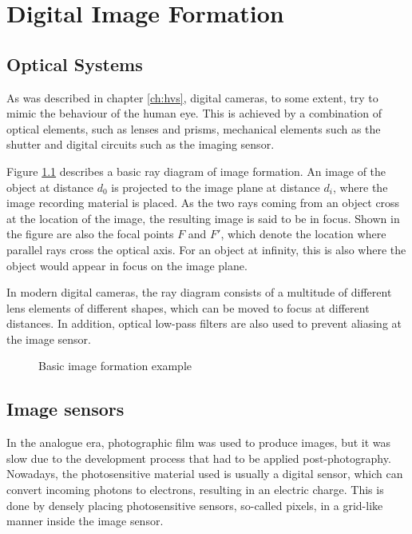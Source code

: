 \chapter{Digital Image Formation}
\label{ch:dif}

\section{Optical Systems}
As was described in chapter \ref{ch:hvs}, digital cameras, to some extent, try to mimic the behaviour of the human eye. This is achieved by a combination of optical elements, such as lenses and prisms, mechanical elements such as the shutter and digital circuits such as the imaging sensor. 

Figure \ref{fig:optics} describes a basic ray diagram of image formation. An image of the object at distance $d_0$ is projected to the image plane at distance $d_i$, where the image recording material is placed. As the two rays coming from an object cross at the location of the image, the resulting image is said to be in focus. Shown in the figure are also the focal points $F$ and $F'$, which denote the location where parallel rays cross the optical axis. For an object at infinity, this is also where the object would appear in focus on the image plane.

In modern digital cameras, the ray diagram consists of a multitude of different lens elements of different shapes, which can be moved to focus at different distances. In addition, optical low-pass filters are also used to prevent aliasing at the image sensor.

\begin{figure}
\centering

\caption{Basic image formation example}
\label{fig:optics}
\end{figure}

\section{Image sensors}

In the analogue era, photographic film was used to produce images, but it was slow due to the development process that had to be applied post-photography. Nowadays, the photosensitive material used is usually a digital sensor, which can convert incoming photons to electrons, resulting in an electric charge. This is done by densely placing photosensitive sensors, so-called pixels, in a grid-like manner inside the image sensor. 

